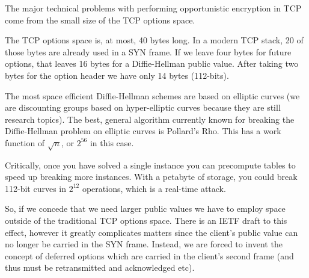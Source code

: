 \documentclass[conference]{IEEEtran}
\begin{document}

The major technical problems with performing opportunistic encryption in TCP
come from the small size of the TCP options space.

The TCP options space is, at most, 40 bytes long. In a modern TCP stack, 20 of
those bytes are already used in a SYN frame. If we leave four bytes for future
options, that leaves 16 bytes for a Diffie-Hellman public value. After taking two
bytes for the option header we have only 14 bytes (112-bits).

The most space efficient Diffie-Hellman schemes are based on elliptic curves
(we are discounting groups based on hyper-elliptic curves\cite{edwards} because
they are still research topics). The best, general algorithm currently known
for breaking the Diffie-Hellman problem on elliptic curves is Pollard's Rho.
This has a work function of $\sqrt{n}$, or $2^{56}$ in this case.

Critically, once you have solved a single instance you can precompute tables to
speed up breaking more instances. With a petabyte of storage, you could break
112-bit curves in $2^{12}$ operations, which is a real-time attack.

So, if we concede that we need larger public values we have to employ space
outside of the traditional TCP options space. There is an IETF draft to this
effect\cite{tcploo}, however it greatly complicates matters since the client's public
value can no longer be carried in the SYN frame. Instead, we are forced to
invent the concept of deferred options which are carried in the client's second
frame (and thus must be retransmitted and acknowledged etc).






\end{document}
